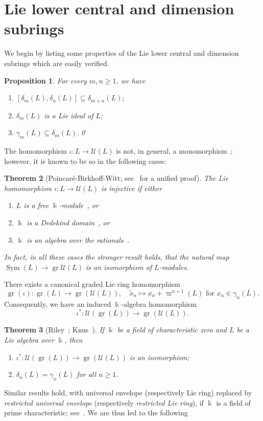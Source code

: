 \documentclass[a4paper,reqno,notitlepage]{amsart}
\newtheorem{theorem}{Theorem}[section]
\newtheorem{prop}[theorem]{Proposition}
\theoremstyle{definition}
\newcommand\K{\Bbbk}
\newcommand\U{\mathscr U}
\newcommand\gr{\operatorname{gr}}
\begin{document}
\section{Lie lower central and dimension subrings}
We begin by listing some properties of the Lie lower central and
dimension subrings which are easily verified.
\begin{prop}
  For every $m,n\ge1$, we have
  \begin{enumerate}
  \item[(i)] $[\delta_{m}(L),\delta_n(L)]\subseteq \delta_{m+n}(L);$
  \item[(ii)] $\delta_{m}(L)$ is a Lie ideal of $L$;
  \item[(iii)] $\gamma_m(L)\subseteq \delta_{m}(L)$.\qed
  \end{enumerate}
\end{prop}

The homomorphism $\iota:L\to \U(L)$ is not, in general, a
monomorphism~\cites{Shirshov:PBW,Cartier:1958}; however, it is known
to be so in the following cases:
\begin{theorem}[Poincar\'{e}-Birkhoff-Witt; see~\cite{Higgins:69} for a unified proof]\label{thm:PBW}
  The Lie homomorphism
  $\iota:L\to \U(L)$ is injective if either
  \begin{enumerate}
  \item[(i)] $L$ is a free $\K$-module~\cites{Birkhoff:1937,Witt:37}, or
  \item[(ii)] $\K$ is a Dedekind domain~\cites{Cartier:1958,Lazard:1954}, or
  \item[(iii)] $\K$ is an algebra over the rationals~\cite{Cohn:1963}.
  \end{enumerate}

  In fact, in all these cases the stronger result holds, that the
  natural map $\operatorname{Sym}(L)\to\gr\U(L)$ is an isomorphism of
  $L$-modules.
\end{theorem}

\noindent There exists a canonical graded Lie ring homomorphism
\[\gr(\iota): \gr(L)\to \gr(\U(L)), \quad
\tilde{x}_n\mapsto x_n+\varpi^{n+1}(L)\text{ for }x_n\in
\gamma_n(L).
\]
Consequently, we have an induced $\K$-algebra homomorphism
\[\iota^*:\U(\gr(L))\to \gr(\U(L)).\]

\begin{theorem}[Riley~\cite{Riley:1995}; Knus~\cite{Knus:1969}]
  If $\K$ be a field of characteristic zero and $L$ be a Lie algebra
  over $\K$, then
  \begin{enumerate}
  \item[(i)] $\iota^*:\U(\gr(L))\to \gr(\U(L))$ is an isomorphism;
  \item[(ii)] $\delta_n(L)=\gamma_n(L)$ for all $n\geq 1$.
  \end{enumerate}
\end{theorem}
Similar results hold, with universal envelope (respectively Lie ring)
replaced by \emph{restricted universal envelope} (respectively
\emph{restricted Lie ring}), if $\K$ is a field of prime
characteristic; see~\cites{RS:1993,RS:1995a}. We are thus led to the
following
\end{document}
